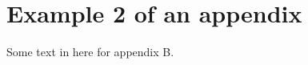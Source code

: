 
\chapter{Example 2 of an appendix}\label{How_to_use_OpenDA_models}

Some text in here for appendix B.